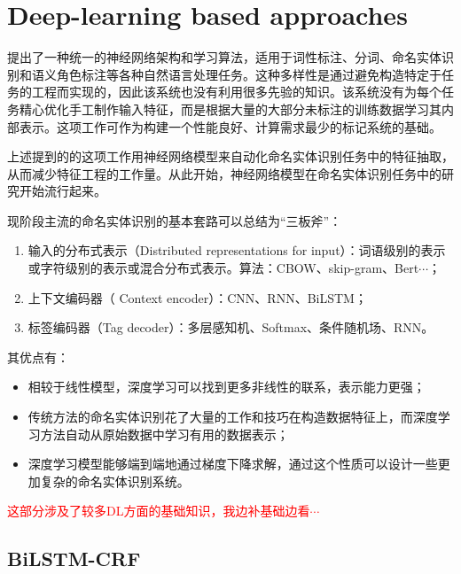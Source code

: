\documentclass[a4paper,UTF8,no-math]{ctexart}
\begin{document}
	
	\section{Deep-learning based approaches}
	

	
	\citep{collobert2011natural}提出了一种统一的神经网络架构和学习算法，适用于词性标注、分词、命名实体识别和语义角色标注等各种自然语言处理任务。这种多样性是通过避免构造特定于任务的工程而实现的，因此该系统也没有利用很多先验的知识。该系统没有为每个任务精心优化手工制作输入特征，而是根据大量的大部分未标注的训练数据学习其内部表示。这项工作可作为构建一个性能良好、计算需求最少的标记系统的基础。
	
	上述提到的\citep{collobert2011natural}的这项工作用神经网络模型来自动化命名实体识别任务中的特征抽取，从而减少特征工程的工作量。从此开始，神经网络模型在命名实体识别任务中的研究开始流行起来。
	
	现阶段主流的命名实体识别的基本套路可以总结为“三板斧”：
	
	\begin{enumerate}
\item 输入的分布式表示（Distributed representations for input）：词语级别的表示或字符级别的表示或混合分布式表示。算法：CBOW、skip-gram、Bert$\cdots$；
\item 上下文编码器（ Context encoder）：CNN、RNN、BiLSTM；
\item 标签编码器（Tag decoder）：多层感知机、Softmax、条件随机场、RNN。
	\end{enumerate}
	
	
	其优点有：
	
	\begin{itemize}
\item 相较于线性模型，深度学习可以找到更多非线性的联系，表示能力更强；
\item 传统方法的命名实体识别花了大量的工作和技巧在构造数据特征上，而深度学习方法自动从原始数据中学习有用的数据表示；
\item 深度学习模型能够端到端地通过梯度下降求解，通过这个性质可以设计一些更加复杂的命名实体识别系统。
	\end{itemize}


	\textcolor{red}{这部分涉及了较多DL方面的基础知识，我边补基础边看$\cdots$}
	\subsection{BiLSTM-CRF}
	
\end{document}
